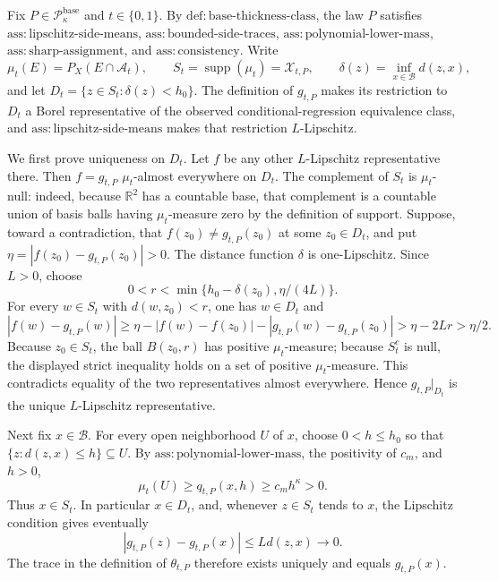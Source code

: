 Fix \(P\in\mathcal P_{\kappa}^{\mathrm{base}}\) and \(t\in\{0,1\}\). By \(\mathrm{def:base\text{-}thickness\text{-}class}\), the law \(P\) satisfies \(\mathrm{ass:lipschitz\text{-}side\text{-}means}\), \(\mathrm{ass:bounded\text{-}side\text{-}traces}\), \(\mathrm{ass:polynomial\text{-}lower\text{-}mass}\), \(\mathrm{ass:sharp\text{-}assignment}\), and \(\mathrm{ass:consistency}\). Write
\[
 \mu_t(E)=P_X(E\cap\mathcal A_t),\qquad
 S_t=\operatorname{supp}(\mu_t)=\mathcal X_{t,P},\qquad
 \delta(z)=\inf_{x\in\mathcal B}d(z,x),
\]
and let \(D_t=\{z\in S_t:\delta(z)<h_0\}\). The definition of \(g_{t,P}\) makes its restriction to \(D_t\) a Borel representative of the observed conditional-regression equivalence class, and \(\mathrm{ass:lipschitz\text{-}side\text{-}means}\) makes that restriction \(L\)-Lipschitz.

We first prove uniqueness on \(D_t\). Let \(f\) be any other \(L\)-Lipschitz representative there. Then \(f=g_{t,P}\) \(\mu_t\)-almost everywhere on \(D_t\). The complement of \(S_t\) is \(\mu_t\)-null: indeed, because \(\mathbb R^2\) has a countable base, that complement is a countable union of basis balls having \(\mu_t\)-measure zero by the definition of support. Suppose, toward a contradiction, that \(f(z_0)\ne g_{t,P}(z_0)\) at some \(z_0\in D_t\), and put \(\eta=|f(z_0)-g_{t,P}(z_0)|>0\). The distance function \(\delta\) is one-Lipschitz. Since \(L>0\), choose
\[
 0<r<\min\{h_0-\delta(z_0),\eta/(4L)\}.
\]
For every \(w\in S_t\) with \(d(w,z_0)<r\), one has \(w\in D_t\) and
\[
 |f(w)-g_{t,P}(w)|
 \ge \eta-|f(w)-f(z_0)|-|g_{t,P}(w)-g_{t,P}(z_0)|
 >\eta-2Lr>\eta/2.
\]
Because \(z_0\in S_t\), the ball \(B(z_0,r)\) has positive \(\mu_t\)-measure; because \(S_t^c\) is null, the displayed strict inequality holds on a set of positive \(\mu_t\)-measure. This contradicts equality of the two representatives almost everywhere. Hence \(g_{t,P}|_{D_t}\) is the unique \(L\)-Lipschitz representative.

Next fix \(x\in\mathcal B\). For every open neighborhood \(U\) of \(x\), choose \(0<h\le h_0\) so that \(\{z:d(z,x)\le h\}\subseteq U\). By \(\mathrm{ass:polynomial\text{-}lower\text{-}mass}\), the positivity of \(c_m\), and \(h>0\),
\[
 \mu_t(U)\ge q_{t,P}(x,h)\ge c_mh^\kappa>0.
\]
Thus \(x\in S_t\). In particular \(x\in D_t\), and, whenever \(z\in S_t\) tends to \(x\), the Lipschitz condition gives eventually
\[
 |g_{t,P}(z)-g_{t,P}(x)|\le Ld(z,x)\longrightarrow0.
\]
The trace in the definition of \(\theta_{t,P}\) therefore exists uniquely and equals \(g_{t,P}(x)\).

